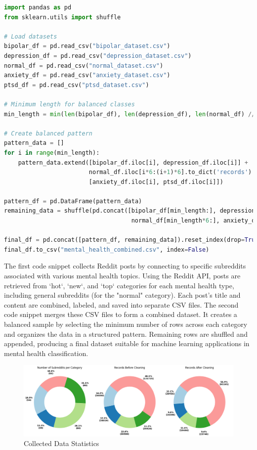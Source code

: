 \begin{tcolorbox}[colback=gray!5!white, colframe=gray!80!black, boxrule=0.5pt, title=Combining Collected Datasets]
\begin{lstlisting}[language=Python]
import pandas as pd
from sklearn.utils import shuffle

# Load datasets
bipolar_df = pd.read_csv("bipolar_dataset.csv")
depression_df = pd.read_csv("depression_dataset.csv")
normal_df = pd.read_csv("normal_dataset.csv")
anxiety_df = pd.read_csv("anxiety_dataset.csv")
ptsd_df = pd.read_csv("ptsd_dataset.csv")

# Minimum length for balanced classes
min_length = min(len(bipolar_df), len(depression_df), len(normal_df) // 6, len(anxiety_df), len(ptsd_df))

# Create balanced pattern
pattern_data = []
for i in range(min_length):
    pattern_data.extend([bipolar_df.iloc[i], depression_df.iloc[i]] +
                        normal_df.iloc[i*6:(i+1)*6].to_dict('records') +
                        [anxiety_df.iloc[i], ptsd_df.iloc[i]])

pattern_df = pd.DataFrame(pattern_data)
remaining_data = shuffle(pd.concat([bipolar_df[min_length:], depression_df[min_length:], 
                                    normal_df[min_length*6:], anxiety_df[min_length:], ptsd_df[min_length:]]))

final_df = pd.concat([pattern_df, remaining_data]).reset_index(drop=True)
final_df.to_csv("mental_health_combined.csv", index=False)
\end{lstlisting}
\end{tcolorbox}
    
\noindent
The first code snippet collects Reddit posts by connecting to specific subreddits associated with various mental health topics. Using the Reddit API, posts are retrieved from `hot`, `new`, and `top` categories for each mental health type, including general subreddits (for the "normal" category). Each post’s title and content are combined, labeled, and saved into separate CSV files. The second code snippet merges these CSV files to form a combined dataset. It creates a balanced sample by selecting the minimum number of rows across each category and organizes the data in a structured pattern. Remaining rows are shuffled and appended, producing a final dataset suitable for machine learning applications in mental health classification.
    


\begin{figure}[h!]  
    \centering
    \includegraphics[width=1.0\textwidth]{Images/Data Collection Graph.png}  
    \caption{Collected Data Statistics}
    \label{LSTMROC7uyiut11}  %
\end{figure}

